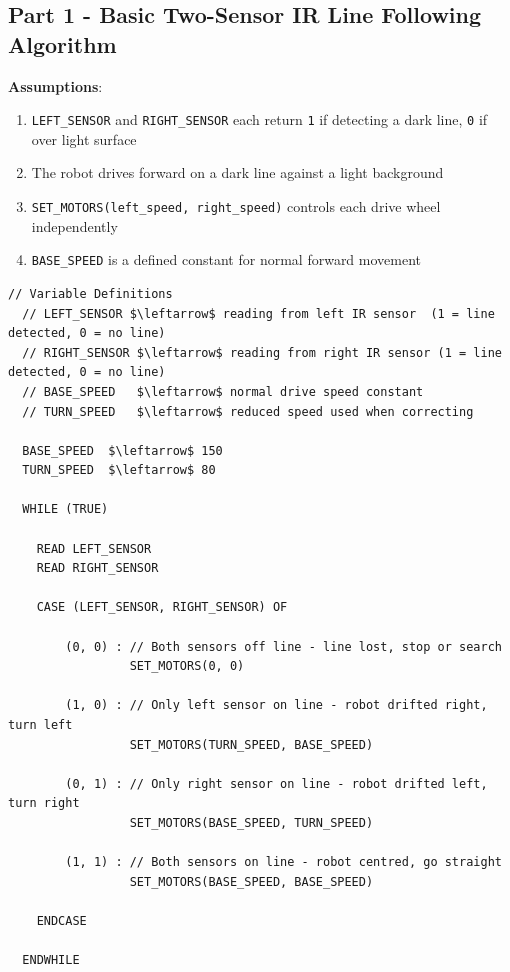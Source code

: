 \documentclass[11 pt , a 4 paper ]{article}
\theoremstyle{definition}
\begin{document}
  \subsection*{Part 1 - Basic Two-Sensor IR Line Following Algorithm}
  \textbf{Assumptions}:
  \begin{enumerate}
    \item \texttt{LEFT\_SENSOR} and \texttt{RIGHT\_SENSOR} each return \texttt{1} if detecting a dark line, \texttt{0} if over light surface
    \item The robot drives forward on a dark line against a light background
    \item \texttt{SET\_MOTORS(left\_speed, right\_speed)} controls each drive wheel independently
    \item \texttt{BASE\_SPEED} is a defined constant for normal forward movement
  \end{enumerate}
  \begin{lstlisting}[mathescape=true]
  // Variable Definitions
  // LEFT_SENSOR $\leftarrow$ reading from left IR sensor  (1 = line detected, 0 = no line)
  // RIGHT_SENSOR $\leftarrow$ reading from right IR sensor (1 = line detected, 0 = no line)
  // BASE_SPEED   $\leftarrow$ normal drive speed constant
  // TURN_SPEED   $\leftarrow$ reduced speed used when correcting

  BASE_SPEED  $\leftarrow$ 150
  TURN_SPEED  $\leftarrow$ 80
  
  WHILE (TRUE)

    READ LEFT_SENSOR
    READ RIGHT_SENSOR

    CASE (LEFT_SENSOR, RIGHT_SENSOR) OF

        (0, 0) : // Both sensors off line - line lost, stop or search
                 SET_MOTORS(0, 0)

        (1, 0) : // Only left sensor on line - robot drifted right, turn left
                 SET_MOTORS(TURN_SPEED, BASE_SPEED)

        (0, 1) : // Only right sensor on line - robot drifted left, turn right
                 SET_MOTORS(BASE_SPEED, TURN_SPEED)

        (1, 1) : // Both sensors on line - robot centred, go straight
                 SET_MOTORS(BASE_SPEED, BASE_SPEED)

    ENDCASE

  ENDWHILE
  \end{lstlisting}
\end{document}
